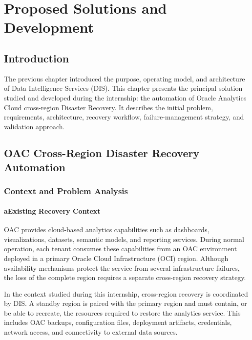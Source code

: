 \chapter{Proposed Solutions and Development}
\label{chap:chapter3}

\section*{Introduction}

The previous chapter introduced the purpose, operating model, and architecture
of Data Intelligence Services (DIS). This chapter presents the principal
solution studied and developed during the internship: the automation of Oracle
Analytics Cloud cross-region Disaster Recovery. It describes the initial
problem, requirements, architecture, recovery workflow, failure-management
strategy, and validation approach.

\section{OAC Cross-Region Disaster Recovery Automation}

\subsection{Context and Problem Analysis}

\subsubsection*{a\quad Existing Recovery Context}

OAC provides cloud-based analytics capabilities such as dashboards, visualizations, datasets, semantic models, and reporting services. During normal operation, each tenant consumes these capabilities from an OAC environment deployed in a primary Oracle Cloud Infrastructure (OCI) region. Although availability mechanisms protect the service from several infrastructure failures, the loss of the complete region requires a separate cross-region recovery strategy.

In the context studied during this internship, cross-region recovery is coordinated by DIS. A standby region is paired with the primary region and must contain, or be able to recreate, the resources required to restore the analytics service. This includes OAC backups, configuration files, deployment artifacts, credentials, network access, and connectivity to external data sources.

